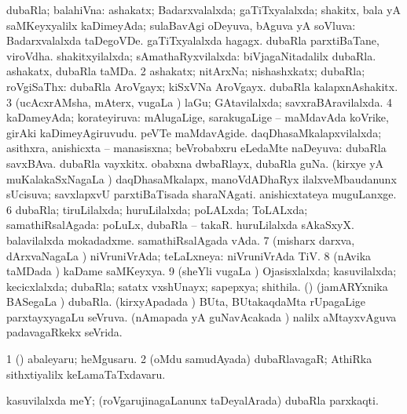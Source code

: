 \bentry
{} 
\gl{\gu}
\expl{}
\bmng
\bnum
{} 
\banum
{} dubaRla; balahiVna: ashakatx; Badarxvalalxda; gaTiTxyalalxda; shakitx, bala yA saMKeyxyalilx kaDimeyAda; sulaBavAgi oDeyuva, bAguva yA soVluva:  Badarxvalalxda taDegoVDe.  gaTiTxyalalxda hagagx.  dubaRla parxtiBaTane, viroVdha. 
 shakitxyilalxda; sAmathaRyxvilalxda:  biVjagaNitadalilx dubaRla.  ashakatx, dubaRla taMDa. 
\eanum
\numie
\num{2} ashakatx; nitArxNa; nishashxkatx; dubaRla; roVgiSaThx:  dubaRla AroVgayx; kiSxVNa AroVgayx.  dubaRla kalapxnAshakitx. 
\num{3} (ucAcxrAMsha, mAterx, \mo vugaLa \vi) laGu; GAtavilalxda; savxraBAravilalxda. 
\num{4} kaDameyAda; korateyiruva:  mAlugaLige, sarakugaLige -- maMdavAda koVrike, girAki kaDimeyAgiruvudu.  peVTe maMdavAgide. 
\banum
{} daqDhasaMkalapxvilalxda; asithxra, anishicxta -- manasisxna; beVrobabxru eLedaMte naDeyuva:  dubaRla savxBAva.  dubaRla vayxkitx.  obabxna dwbaRlayx, dubaRla guNa. 
 (kirxye yA muKalakaSxNagaLa \vi) daqDhasaMkalapx, manoVdADhaRyx ilalxveMbaudanunx sUcisuva;  savxlapxvU parxtiBaTisada sharaNAgati.  anishicxtateya muguLanxge. 
\eanum
\numie
\num{6} dubaRla; tiruLilalxda; huruLilalxda; poLALxda; ToLALxda; samathiRsalAgada:  poLuLx, dubaRla -- takaR.  huruLilalxda sAkaSxyX.  balavilalxda mokadadxme.  samathiRsalAgada vAda. 
\num{7} (misharx darxva, dArxvaNagaLa \vi) niVruniVrAda; teLaLxneya:  niVruniVrAda TiV. 
\num{8} (nAvika taMDada \vi) kaDame saMKeyxya. 
\num{9} (sheYli \mo vugaLa \vi) Ojasisxlalxda; kasuvilalxda; kecicxlalxda; dubaRla; satatx vxshUnayx; sapepxya; shithila. 
 (\vAyx) (jamARYxnika BASegaLa \vi) dubaRla. 
\banum
{} (kirxyApadada \vi) BUta, BUtakaqdaMta rUpagaLige  parxtayxyagaLu seVruva. 
 (nAmapada yA guNavAcakada \vi)  nalilx aMtayxvAguva padavagaRkekx seVrida. 
\eanum
\numie
\enum
\emng

\noindent 
\gl{\pagu}
\expl{}
\bmng
\bnum
\num{1}  (\hiV) abaleyaru; heMgusaru. 
\num{2}  (oMdu samudAyada) dubaRlavagaR; AthiRka sithxtiyalilx keLamaTaTxdavaru. 
\enum
\emng
\eentry

\bentry
{} 
\gl{\nA}
\expl{}
\bmng
kasuvilalxda meY; (roVgarujinagaLanunx taDeyalArada) dubaRla parxkaqti. 
\emng
\eentry

